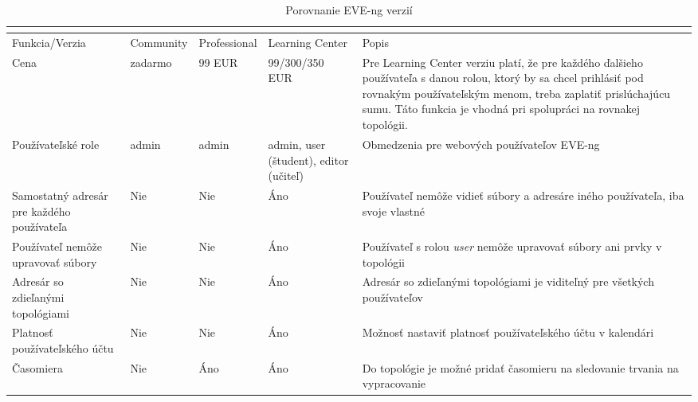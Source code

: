 \begin{longtable}{| m{3cm} | m{2cm} | m{2cm} | m{2cm} | m{4cm} |}
\caption{Porovnanie EVE-ng verzií}
\cite{eve_ng_versions_table}
\label{tab:eve_ng_versions} \\
\hline
Funkcia/Verzia                                      & Community         & Professional    & Learning Center      & Popis                                                                                                   \\ \hline
Cena                                                 & zadarmo              & 99 EUR  & 99/300/350 EUR & Pre Learning Center verziu platí, že pre každého ďalšieho používateľa s danou rolou, ktorý by sa chcel prihlásiť pod rovnakým používateľským menom, treba zaplatiť prislúchajúcu sumu. Táto funkcia je vhodná pri spolupráci na rovnakej topológii.
\\ \hline
Používateľské role                                          & admin        & admin      & admin, user (študent), editor (učiteľ)  & Obmedzenia pre webových používateľov EVE-ng \\ \hline
Samostatný adresár pre každého používateľa                                  & Nie                & Nie              & Áno                  & Používateľ nemôže vidieť súbory a adresáre iného používateľa, iba svoje vlastné \\ \hline
Používateľ nemôže upravovať súbory                                 & Nie                & Nie              & Áno                  & Používateľ s rolou \emph{user} nemôže upravovať súbory ani prvky v topológii                                                                             \\ \hline
Adresár so zdieľanými topológiami                                     & Nie                & Nie              & Áno                  & Adresár so zdieľanými topológiami je viditeľný pre všetkých používateľov                                                                       \\ \hline
Platnosť používateľského účtu         & Nie                & Nie              & Áno                  & Možnosť nastaviť platnosť používateľského účtu v kalendári                         \\ \hline
Časomiera                                             & Nie                & Áno             & Áno                  & Do topológie je možné pridať časomieru na sledovanie trvania na vypracovanie                                                                                          \\ \hline

\end{longtable}

